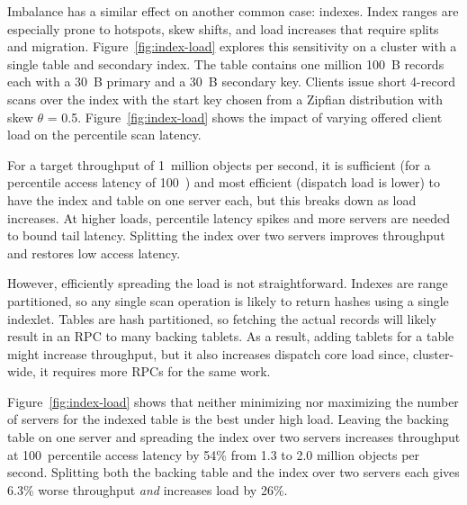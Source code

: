Imbalance has a similar effect on another common case: indexes.
Index ranges are especially prone to hotspots, skew shifts, and load increases
that require splits and migration.
%
Figure~\ref{fig:index-load} explores this sensitivity on a cluster with a single
table and secondary index.  The table contains one million 100~B records each
with a 30~B primary and a 30~B secondary key. Clients issue short 4-record scans over
the index with the start key chosen from a Zipfian distribution with skew
$\theta$ = 0.5.
Figure~\ref{fig:index-load} shows the impact of varying offered client load on
the \nnnth percentile scan latency.

For a target throughput of 1~million objects per second, it is sufficient
(for a \nnnth percentile access latency of 100~\us) and
most efficient (dispatch load is lower) to have the index and table on one server each, but this breaks
down as load increases. At higher loads, \nnnth percentile latency spikes and
more servers are needed to bound tail latency. Splitting the index over two
servers improves throughput and restores low access latency.

However, efficiently spreading the load is not straightforward.  Indexes are
range partitioned, so any single scan operation is likely to return hashes using a single
indexlet.  Tables are hash partitioned, so fetching the actual records will
likely result in an RPC to many backing tablets.  As a result, adding tablets for a table
might increase throughput, but it also increases dispatch core load since, cluster-wide,
it requires more RPCs for the same work.

Figure~\ref{fig:index-load} shows that neither minimizing nor maximizing the
number of servers for the indexed table is the best under high load. Leaving the
backing table on one server and spreading the index over two servers increases
throughput at 100~\us \nnnth percentile access latency by 54\% from 1.3 to 2.0
million objects per second. Splitting both the backing table and the index over two
servers each gives 6.3\% worse throughput {\em and} increases load by 26\%.


